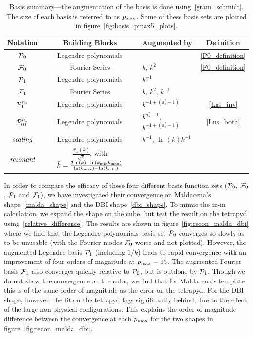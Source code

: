 \begin{table}[h!]
  \begin{center}
    \begin{tabular}{c|c|l|c}
      \textbf{Notation} & \textbf{Building Blocks} & \textbf{Augmented by} & \textbf{Definition}\\
      \hline
        $\mathcal{P}_0$  & Legendre polynomials &                & \eqref{P0_definition}\\
        $\mathcal{F}_0$  & Fourier Series & $k$, $k^2$           & \eqref{F0_definition}\\
        $\mathcal{P}_1$   & Legendre polynomials & $k^{-1}$       & \\
        $\mathcal{F}_1$   & Fourier Series & $k$, $k^2$, $k^{-1}$ & \\
        $\mathcal{P}^{n_s}_1$  & Legendre polynomials & $k^{-1+(n_s^{*}-1)}$   & \eqref{Lns_inv}\\
        $\mathcal{P}^{n_s}_{01}$ & Legendre polynomials& $k^{n_s^{*}-1}$, $k^{-1+(n_s^{*}-1)}$ & \eqref{Lns_both}\\
        $\textit{scaling}$ & Legendre polynomials& $k^{-1}$, $\ln(k)k^{-1}$ &\\
        $\textit{resonant}$ & $\frac{\mathcal{P}_n(\bar{k})}{\sqrt{k}}$, with $\bar{k}=\frac{2\ln(k)-\ln({k_\text{min}}{k_\text{max}})}{\ln({k_\text{max}})-\ln({k_\text{min}})}$& &\\
    \end{tabular}
    \caption{
          Basis summary---the augmentation of the basis is done
          using~\eqref{gram_schmidt}. The size of each basis is
          referred to as $p_\text{max}$. Some of these basis sets are
          plotted in figure~\ref{fig:basis_pmax5_plots}.
      }\label{tab:basis_summary}
  \end{center}
\end{table}

In order to compare the efficacy of these four different basis function sets ($\mathcal{P}_0$, $\mathcal{F}_0$, $\mathcal{P}_1$ and $\mathcal{F}_1$), we have investigated their convergence on Maldacena's shape~\eqref{malda_shape} and the DBI shape~\eqref{dbi_shape}.  To mimic the in-in calculation, we expand the shape on the cube, but test the result on the tetrapyd
using~\eqref{relative_difference}.
The results are shown in figure~\ref{fig:recon_malda_dbi} where we find that the Legendre polynomials basis set $\mathcal{P}_0$ converges so slowly as to be unusable (with the Fourier modes $\mathcal{F}_0$ worse and not plotted).
However, the augmented Legendre basis $\mathcal{P}_1$ (including $1/k$) leads to rapid convergence with an improvement of four orders
of magnitude at $p_\text{max}=15$. The augmented Fourier basis $\mathcal{F}_1$ also converges
quickly relative to $\mathcal{P}_0$, but is outdone by $\mathcal{P}_1$.
Though we do not show the convergence on the cube, we find that for Maldacena's
template this is of the same order of magnitude as
the error on the tetrapyd.  For the DBI shape, however, the
fit on the tetrapyd lags significantly behind, due to the effect
of the large non-physical configurations. This explains the order of
magnitude difference between the convergence at
each $p_\text{max}$ for the two shapes in figure~\ref{fig:recon_malda_dbi}.


